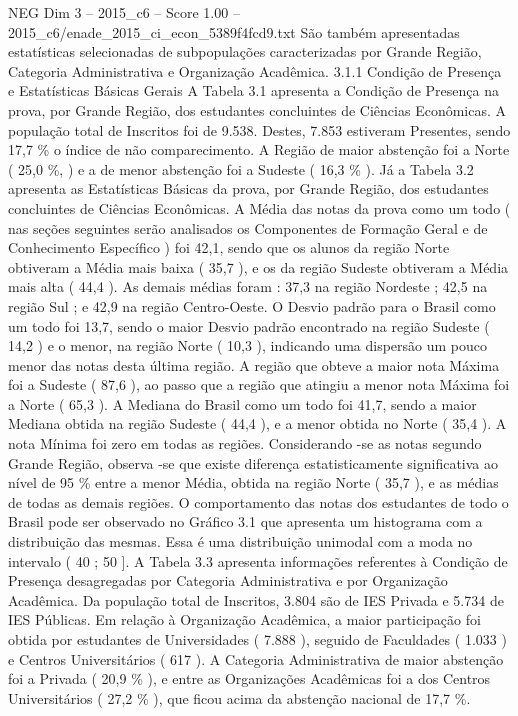 \begin{textsample}{NEG Dim 3 – 2015\_c6 – Score 1.00 – 2015\_c6/enade\_2015\_ci\_econ\_5389f4fcd9.txt}
São também apresentadas estatísticas selecionadas de subpopulações caracterizadas por Grande Região, Categoria Administrativa e Organização Acadêmica. 3.1.1 Condição de Presença e Estatísticas Básicas Gerais A Tabela 3.1 apresenta a Condição de Presença na prova, por Grande Região, dos estudantes concluintes de Ciências Econômicas.
A população total de Inscritos foi de 9.538.
Destes, 7.853 estiveram Presentes, sendo 17,7 \% o índice de não comparecimento.
A Região de maior abstenção foi a Norte ( 25,0 \%, ) e a de menor abstenção foi a Sudeste ( 16,3 \% ).
Já a Tabela 3.2 apresenta as Estatísticas Básicas da prova, por Grande Região, dos estudantes concluintes de Ciências Econômicas.
A Média das notas da prova como um todo ( nas seções seguintes serão analisados os Componentes de Formação Geral e de Conhecimento Específico ) foi 42,1, sendo que os alunos da região Norte obtiveram a Média mais baixa ( 35,7 ), e os da região Sudeste obtiveram a Média mais alta ( 44,4 ).
As demais médias foram : 37,3 na região Nordeste ; 42,5 na região Sul ; e 42,9 na região Centro-Oeste.
O Desvio padrão para o Brasil como um todo foi 13,7, sendo o maior Desvio padrão encontrado na região Sudeste ( 14,2 ) e o menor, na região Norte ( 10,3 ), indicando uma dispersão um pouco menor das notas desta última região.
A região que obteve a maior nota Máxima foi a Sudeste ( 87,6 ), ao passo que a região que atingiu a menor nota Máxima foi a Norte ( 65,3 ).
A Mediana do Brasil como um todo foi 41,7, sendo a maior Mediana obtida na região Sudeste ( 44,4 ), e a menor obtida no Norte ( 35,4 ).
A nota Mínima foi zero em todas as regiões.
Considerando -se as notas segundo Grande Região, observa -se que existe diferença estatisticamente significativa ao nível de 95 \% entre a menor Média, obtida na região Norte ( 35,7 ), e as médias de todas as demais regiões.
O comportamento das notas dos estudantes de todo o Brasil pode ser observado no Gráfico 3.1 que apresenta um histograma com a distribuição das mesmas.
Essa é uma distribuição unimodal com a moda no intervalo ( 40 ; 50 ].
A Tabela 3.3 apresenta informações referentes à Condição de Presença desagregadas por Categoria Administrativa e por Organização Acadêmica.
Da população total de Inscritos, 3.804 são de IES Privada e 5.734 de IES Públicas.
Em relação à Organização Acadêmica, a maior participação foi obtida por estudantes de Universidades ( 7.888 ), seguido de Faculdades ( 1.033 ) e Centros Universitários ( 617 ).
A Categoria Administrativa de maior abstenção foi a Privada ( 20,9 \% ), e entre as Organizações Acadêmicas foi a dos Centros Universitários ( 27,2 \% ), que ficou acima da abstenção nacional de 17,7 \%.

\end{textsample}
